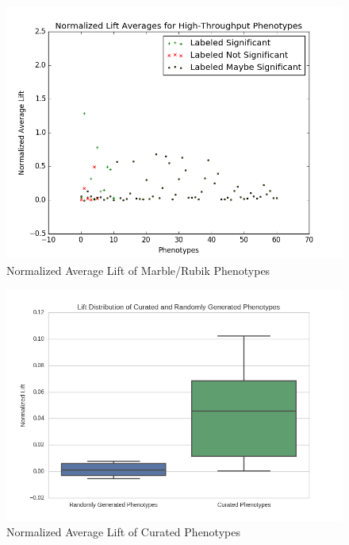 \documentclass{sig-alternate}
\begin{document}
\begin{figure} [t]
\centering
\includegraphics[width=\linewidth]{normalizedLiftAvg_without0s.png}
\caption{Normalized Average Lift of Marble/Rubik Phenotypes}
\label{fig:kho-josh-all}
\end{figure}


\begin{figure} [t]
\centering
\includegraphics[width=\linewidth] {normalizedLiftAvg_boxplot.png}
\caption{Normalized Average Lift of Curated Phenotypes}
\label{fig:curatedPhenos}
\end{figure}


\end{document}
